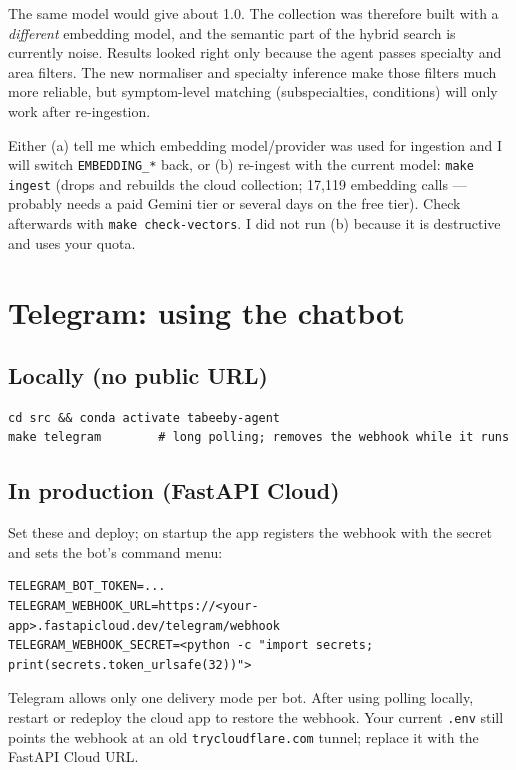\documentclass[11pt,a4paper]{article}
\newcommand{\code}[1]{\texttt{#1}}
\begin{document}
The same model would give about 1.0. The collection was therefore built with a \emph{different} embedding model, and the semantic part of the hybrid search is currently noise. Results looked right only because the agent passes specialty and area filters. The new normaliser and specialty inference make those filters much more reliable, but symptom-level matching (subspecialties, conditions) will only work after re-ingestion.

\begin{action}
Either (a) tell me which embedding model/provider was used for ingestion and I will switch \code{EMBEDDING\_*} back, or (b) re-ingest with the current model: \code{make ingest} (drops and rebuilds the cloud collection; 17{,}119 embedding calls --- probably needs a paid Gemini tier or several days on the free tier). Check afterwards with \code{make check-vectors}. I did not run (b) because it is destructive and uses your quota.
\end{action}

\section{Telegram: using the chatbot}

\subsection{Locally (no public URL)}
\begin{lstlisting}
cd src && conda activate tabeeby-agent
make telegram        # long polling; removes the webhook while it runs
\end{lstlisting}

\subsection{In production (FastAPI Cloud)}
Set these and deploy; on startup the app registers the webhook with the secret and sets the bot's command menu:
\begin{lstlisting}
TELEGRAM_BOT_TOKEN=...
TELEGRAM_WEBHOOK_URL=https://<your-app>.fastapicloud.dev/telegram/webhook
TELEGRAM_WEBHOOK_SECRET=<python -c "import secrets; print(secrets.token_urlsafe(32))">
\end{lstlisting}
Telegram allows only one delivery mode per bot. After using polling locally, restart or redeploy the cloud app to restore the webhook. Your current \code{.env} still points the webhook at an old \code{trycloudflare.com} tunnel; replace it with the FastAPI Cloud URL.
\end{document}
